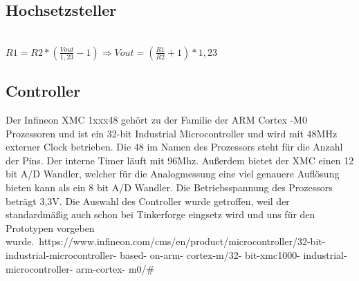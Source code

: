 \subsection{Hochsetzsteller}

\onehalfspacing \\
\(\displaystyle R1=R2*\left(\frac{Vout}{1,23}-1\right)\Rightarrow Vout=\left(\frac{R1}{R2}+1\right)*1,23\) 
\singlespacing

\subsection{Controller}
Der Infineon XMC 1xxx48 gehört zu der Familie der ARM Cortex -M0 Prozessoren und ist ein 32-bit Industrial Microcontroller und wird mit 48MHz externer Clock betrieben. Die 48 im Namen des Prozessors steht für die Anzahl der Pins. Der interne Timer läuft mit 96Mhz. Außerdem bietet der XMC einen 12 bit A/D Wandler, welcher für die Analogmessung eine viel genauere Auflösung bieten kann als ein 8 bit A/D Wandler. Die Betriebsspannung des Prozessors beträgt 3,3V. Die Auswahl des Controller wurde getroffen, weil der standardmäßig auch schon bei Tinkerforge eingsetz wird und uns für den Prototypen vorgeben wurde.\
https://www.infineon.com/cms/en/product/microcontroller/32-bit- industrial-microcontroller- based-
on-arm- cortex-m/32- bit-xmc1000- industrial-microcontroller- arm-cortex- m0/\#\\


